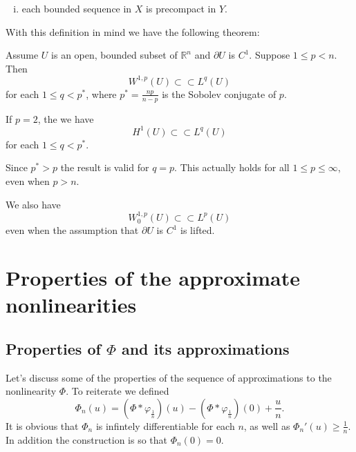 \documentclass[11pt, a4paper]{article}
\begin{document}
\begin{appendix}
\begin{mydef}
\begin{enumerate}[i)]
	\item each bounded sequence in $X$ is precompact in $Y$.
\end{enumerate}
\end{mydef}

With this definition in mind we have the following theorem:
\begin{theorem}
\label{thm:Rellich}
Assume $U$ is an open, bounded subset of $\mathbb{R}^n$ and $\partial U$ is $C^1$.
Suppose $1\leq p < n$. Then
\begin{equation}
\label{Rellich}
W^{1,p}(U) \subset \subset L^q(U)
\end{equation}
for each $1\leq q < p^*$, where $p^* = \frac{np}{n-p}$ is the Sobolev conjugate of $p$.
\end{theorem}
\setcounter{rem}{0}
\begin{rem}
If $p=2$, the we have
\begin{equation*}
H^1(U) \subset \subset L^q(U)
\end{equation*}
for each $1\leq q < p^*$.
\end{rem}
\begin{rem}
Since $p^* > p$ the result is valid for $q=p$. This actually holds for all $1\leq p \leq \infty$, even when $p > n$.
\end{rem}
\begin{rem}
We also have 
\begin{equation*}
W^{1,p}_0(U) \subset \subset L^p(U)
\end{equation*}
even when the assumption that $\partial U$ is $C^1$ is lifted.
\end{rem}


\newpage
\section{Properties of the approximate nonlinearities}
\subsection{Properties of $\Phi$ and its approximations}
\label{app:Phi}
Let's discuss some of the properties of the sequence of approximations to the nonlinearity $\Phi$. To reiterate we defined
\begin{equation*}
\Phi_n(u) = (\Phi * \varphi_{\frac{1}{n}})(u) - (\Phi * \varphi_{\frac{1}{n}})(0) + \frac{u}{n}.
\end{equation*}
It is obvious that $\Phi_n$ is infintely differentiable for each $n$, as well as $\Phi_n'(u) \geq \frac{1}{n}$. In addition the construction is so that $\Phi_n(0) = 0$.


\end{appendix}
\end{document}
